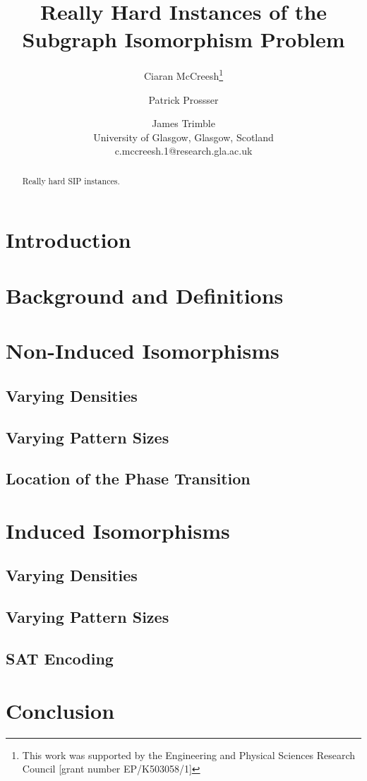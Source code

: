 \documentclass[letterpaper]{article}
\title{Really Hard Instances of the Subgraph Isomorphism Problem}
\author{Ciaran McCreesh\thanks{This work was supported by the Engineering and Physical Sciences
    Research Council [grant number EP/K503058/1]} \and Patrick Prossser \and James Trimble \\
University of Glasgow, Glasgow, Scotland \\
c.mccreesh.1@research.gla.ac.uk}
\begin{document}
\maketitle

\begin{abstract}
    Really hard SIP instances.
\end{abstract}

\section{Introduction}

\section{Background and Definitions}

\section{Non-Induced Isomorphisms}

\subsection{Varying Densities}

\subsection{Varying Pattern Sizes}

\subsection{Location of the Phase Transition}

\section{Induced Isomorphisms}

\subsection{Varying Densities}

\subsection{Varying Pattern Sizes}

\subsection{SAT Encoding}

\section{Conclusion}



\end{document}
